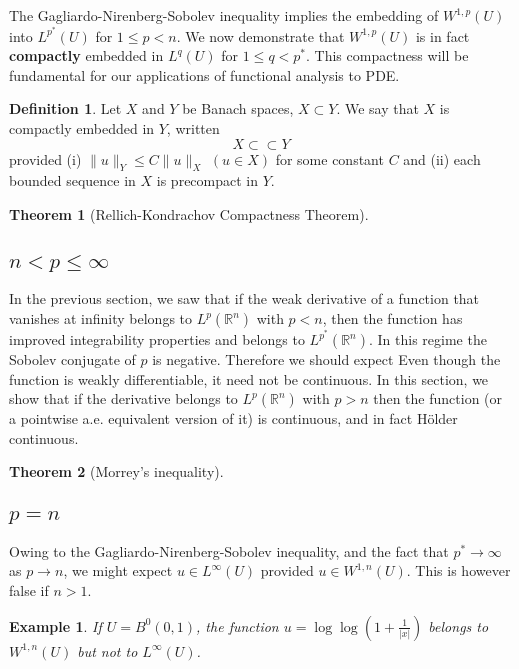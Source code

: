 \documentclass{article}
\newtheorem{theorem}{Theorem}[section]
\newtheorem{example}{Example}[section]
\theoremstyle{definition}
\newtheorem{definition}{Definition}[section]
\begin{document}
The Gagliardo-Nirenberg-Sobolev inequality implies the embedding of $W^{1,p}(U)$ into $L^{p^*}(U)$ for $1\le p<n$.
We now demonstrate that $W^{1,p}(U)$ is in fact \textbf{compactly} embedded in $L^q(U)$ for $1\le q<p^*$.
This compactness will be fundamental for our applications of functional analysis to PDE.
\begin{definition}
    Let $X$ and $Y$ be Banach spaces, $X\subset Y$. We say that $X$ is compactly embedded in $Y$, written 
    \[X\subset \subset Y\] 
    provided \newline 
    (i) $\|u\|_Y\le C\|u\|_X$ $(u\in X)$ for some constant $C$ and \newline 
    (ii) each bounded sequence in $X$ is precompact in $Y$.
\end{definition}


\begin{theorem}[Rellich-Kondrachov Compactness Theorem]
    
\end{theorem}


\subsection{$n<p\le\infty$}
In the previous section, we saw that if the weak derivative of a function that
vanishes at infinity belongs to $L^p(\mathbb{R}^n)$ with $p < n$, then the function has improved
integrability properties and belongs to $L^{p^*}(\mathbb{R}^n)$.
In this regime the Sobolev conjugate of $p$ is negative. Therefore we should expect 
Even though the function is weakly differentiable, it need not be continuous. 
In this section, we show that if the derivative belongs to $L^p(\mathbb{R}^n)$ with $p > n$ then the function (or a pointwise a.e. equivalent
version of it) is continuous, and in fact H\"older continuous. 
\begin{theorem}[Morrey's inequality]
    
\end{theorem}

\subsection{$p=n$}
Owing to the Gagliardo-Nirenberg-Sobolev inequality, and the fact that $p^*\to\infty$ as $p\to n$, we might expect $u\in L^\infty(U)$ provided 
$u\in W^{1,n}(U)$. This is however false if $n>1$.
\begin{example}
    If $U=B^0(0,1)$, the function $u=\log\log (1+\frac{1}{|x|})$ belongs to $W^{1,n}(U)$ but not to $L^\infty(U)$.
\end{example}
\end{document}
